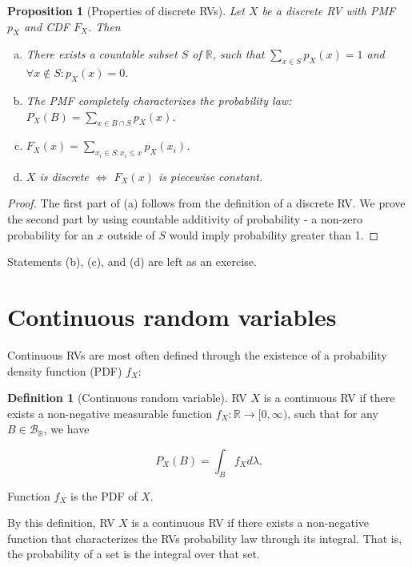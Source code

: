 \documentclass{book}
\theoremstyle{plain}%
\newtheorem{proposition}{Proposition}[section]
\theoremstyle{definition}
\newtheorem{definition}{Definition}[section]
\newlength{\arrow}
\begin{document}
\begin{proposition}[Properties of discrete RVs]

Let $X$ be a discrete RV with PMF $p_X$ and CDF $F_X$. Then

\vspace{0.1pt}
\begin{enumerate}[(a)]
\item There exists a countable subset $S$ of $\mathbb{R}$, such that $\sum_{x \in S} p_X(x) = 1$ and $\forall x \notin S: p_X(x) = 0$.
\item The PMF completely characterizes the probability law: $P_X(B) = \sum_{x \in B \cap S} p_X(x)$.
\item $F_X(x) = \sum_{x_i \in S: x_i \leq x} p_X(x_i)$.
\item $X$ is discrete $\Longleftrightarrow$ $F_X(x)$ is piecewise constant.
\end{enumerate}\label{prop:pmf}
\end{proposition}

\begin{proof}
The first part of (a) follows from the definition of a discrete RV. We prove the second part by using countable additivity of probability - a non-zero probability for an $x$ outside of $S$ would imply probability greater than 1.
\end{proof}


Statements (b), (c), and (d) are left as an exercise.

\section{Continuous random variables}\label{ch:continuous}

Continuous RVs are most often defined through the existence of a probability density function (PDF) $f_X$:

\begin{definition}[Continuous random variable]
RV $X$ is a continuous RV if there exists a non-negative measurable function $f_X:\mathbb{R} \rightarrow [0, \infty)$, such that for any $B \in \mathcal{B}_\mathbb{R}$, we have 

$$P_X(B) = \int_B f_X d\lambda.$$

Function $f_X$ is the PDF of $X$.\label{def:rv}
\end{definition}

By this definition, RV $X$ is a continuous RV if there exists a non-negative function that characterizes the RVs probability law through its integral. That is, the probability of a set is the integral over that set.
\end{document}
